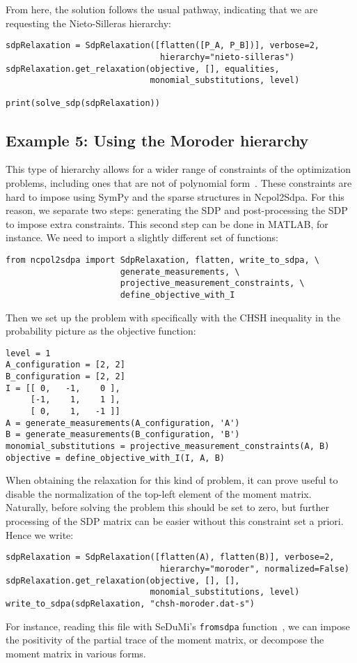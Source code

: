 \documentclass{article}
\begin{document}
From here, the solution follows the usual pathway, indicating that we are requesting the Nieto-Silleras hierarchy:
\begin{verbatim}
sdpRelaxation = SdpRelaxation([flatten([P_A, P_B])], verbose=2,
                               hierarchy="nieto-silleras")
sdpRelaxation.get_relaxation(objective, [], equalities,
                             monomial_substitutions, level)

print(solve_sdp(sdpRelaxation))
\end{verbatim}
\subsection{Example 5: Using the Moroder hierarchy}
This type of hierarchy allows for a wider range of constraints of the optimization problems, including ones that are not of polynomial form~\citep{moroder2013device}. These constraints are hard to impose using SymPy and the sparse structures in Ncpol2Sdpa. For this reason, we separate two steps: generating the SDP and post-processing the SDP to impose extra constraints. This second step can be done in MATLAB, for instance. We need to import a slightly different set of functions: 
\begin{verbatim}
from ncpol2sdpa import SdpRelaxation, flatten, write_to_sdpa, \
                       generate_measurements, \
                       projective_measurement_constraints, \
                       define_objective_with_I
\end{verbatim}
Then we set up the problem with specifically with the CHSH inequality in the probability picture as the objective function:
\begin{verbatim}
level = 1
A_configuration = [2, 2]
B_configuration = [2, 2]
I = [[ 0,   -1,    0 ],
     [-1,    1,    1 ], 
     [ 0,    1,   -1 ]]
A = generate_measurements(A_configuration, 'A')
B = generate_measurements(B_configuration, 'B')
monomial_substitutions = projective_measurement_constraints(A, B)
objective = define_objective_with_I(I, A, B)
\end{verbatim}
When obtaining the relaxation for this kind of problem, it can prove useful to disable the normalization of the top-left element of the moment matrix. Naturally, before solving the problem this should be set to zero, but further processing of the SDP matrix can be easier without this constraint set a priori. Hence we write:
\begin{verbatim}
sdpRelaxation = SdpRelaxation([flatten(A), flatten(B)], verbose=2,
                               hierarchy="moroder", normalized=False)
sdpRelaxation.get_relaxation(objective, [], [],
                             monomial_substitutions, level)
write_to_sdpa(sdpRelaxation, "chsh-moroder.dat-s")  
\end{verbatim}
For instance, reading this file with SeDuMi's \verb+fromsdpa+ function~\citep{sturm1999sedumi}, we can impose the positivity of the partial trace of the moment matrix, or decompose the moment matrix in various forms.
\end{document}
